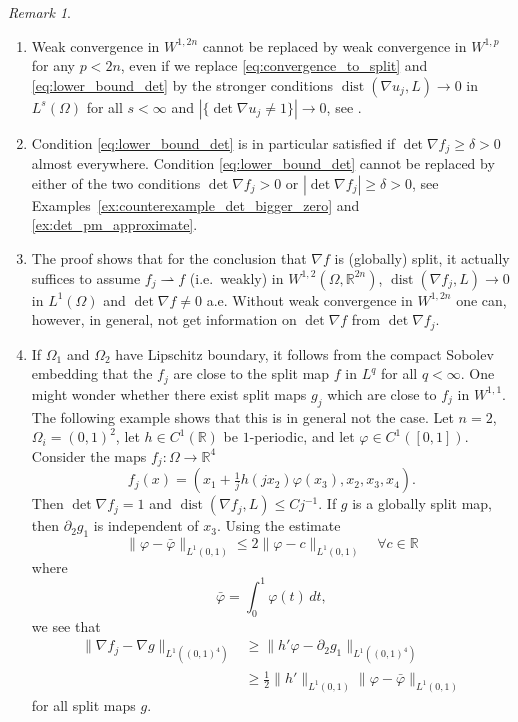 \documentclass[titlepage]{amsart}
\numberwithin{equation}{section}
\theoremstyle{plain}
\theoremstyle{definition}
\theoremstyle{remark}
\newtheorem{remark}[equation]{Remark}
\newcommand{\ben}{\begin{enumerate}}
\newcommand{\dist}{\operatorname{dist}}
\newcommand{\een}{\end{enumerate}}
\newcommand{\R}{\mathbb{R}}
\newcommand{\g}{\nabla }
\begin{document}
\begin{remark}  \label{re:almost_split}~
\ben \item Weak convergence in $W^{1,2n}$ cannot be replaced by weak convergence in $W^{1,p}$ for any $p < 2n$,
even if we replace  \eqref{eq:convergence_to_split} and  \eqref{eq:lower_bound_det} by the stronger conditions
$\dist(\g u_j, L) \to 0$ in $L^s(\Omega)$ for all $s < \infty$ and 
$|\{ \det \g u_j \ne 1\}| \to 0$,
see \cite[Theorem 1.4]{kmsx_counterexample}.
\item  Condition \eqref{eq:lower_bound_det} is in particular satisfied if $\det \g f_j \ge \delta > 0$ almost everywhere. 
Condition \eqref{eq:lower_bound_det}  cannot be replaced by either of the two conditions $\det \g f_j > 0$ or $|\det \g f_j| \ge \delta >0$,  see Examples~\ref{ex:counterexample_det_bigger_zero} and \ref{ex:det_pm_approximate}. 
\item  The proof shows that  for the conclusion that $\g f$ is (globally) split, 
it actually suffices to assume $f_j \rightharpoonup f$ (i.e.~weakly) in $W^{1, 2}(\Omega, \R^{2n})$, $\dist(\g f_j, L) \to 0$ in $L^1(\Omega)$
and $\det \g f \ne 0$ a.e. 
Without weak convergence in $W^{1,2n}$ one can, however, 
 in general, not get information on $\det \g f$ from $\det \g f_j$.
\item \label{it:almost_split_vs_split}
  If $\Omega_1$ and $\Omega_2$ have Lipschitz boundary, it follows from  the compact Sobolev embedding that the $f_j$ are close to the  split map $f$  in
$L^{q}$ for all       $q < \infty$.  One might wonder whether there exist split maps $g_j$ which are close to $f_j$ in $W^{1,1}$.
The following example shows that this is in general not the case. Let $n=2$,  $\Omega_i = (0,1)^2$, let $h \in C^1(\R)$ be $1$-periodic,  
and let $\varphi \in C^1([0,1])$. Consider the maps $f_j:\Omega\to\R^4$ 
\begin{equation*}
f_j(x)=\left(x_1+\tfrac1j h(jx_2) \varphi(x_3),x_2,x_3,x_4\right).
\end{equation*}
Then $\det \g f_j = 1$ and $\dist(\g f_j, L) \le C j^{-1}$.
If $g$ is a globally split map, then $\partial_2 g_1$ is independent of $x_3$.
Using the estimate 
$$
\| \varphi - \bar \varphi\|_{L^1(0,1)}  \le 2  \|\varphi - c \|_{L^1(0,1)}  \quad \forall c \in \R$$
where  
$$\bar \varphi = \int_0^1 \varphi(t) \, dt, $$
we see that 
\begin{equation*}
\begin{split}
  \| \g f_j - \g g\|_{L^1((0,1)^4)} &\ge \|h'\varphi-\partial_2g_1\|_{L^1((0,1)^4)}\\
  &\ge \frac12\|h'\|_{L^1(0,1)}\|\varphi - \bar \varphi\|_{L^1(0,1)}
  \end{split}
\end{equation*}
for all  split maps $g$.
\een
\end{remark}
\end{document}
